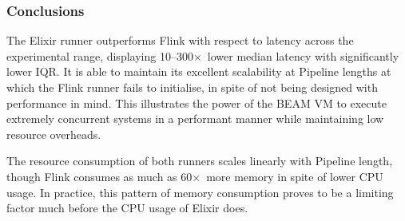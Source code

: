 \subsubsection{Conclusions}

The Elixir runner outperforms Flink with respect to latency across the experimental range, displaying \num{10}--\num{300}$\times$~lower median latency with significantly lower IQR.
It is able to maintain its excellent scalability at Pipeline lengths at which the Flink runner fails to initialise, in spite of not being designed with performance in mind.
This illustrates the power of the BEAM VM to execute extremely concurrent systems in a performant manner while maintaining low resource overheads.

The resource consumption of both runners scales linearly with Pipeline length, though Flink consumes as much as \num{60}$\times$~more memory in spite of lower CPU usage.
In practice, this pattern of memory consumption proves to be a limiting factor much before the CPU usage of Elixir does.

